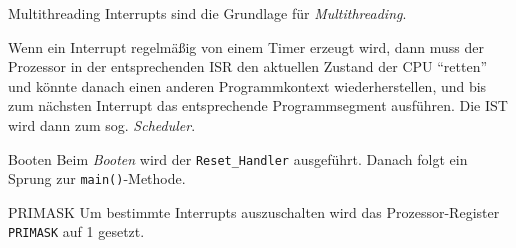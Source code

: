 \begin{defi}{Multithreading}
    Interrupts sind die Grundlage für \emph{Multithreading}.

    Wenn ein Interrupt regelmäßig von einem Timer erzeugt wird, dann muss der Prozessor in der entsprechenden ISR den aktuellen Zustand der CPU \enquote{retten} und könnte danach einen anderen Programmkontext wiederherstellen, und bis zum nächsten Interrupt das entsprechende Programmsegment ausführen.
    Die IST wird dann zum sog. \emph{Scheduler}.
\end{defi}

\begin{defi}{Booten}
    Beim \emph{Booten} wird der \texttt{Reset\_Handler} ausgeführt.
    Danach folgt ein Sprung zur \texttt{main()}-Methode.
\end{defi}

\begin{defi}{PRIMASK}
    Um bestimmte Interrupts auszuschalten wird das Prozessor-Register \texttt{PRIMASK} auf 1 gesetzt.
\end{defi}

